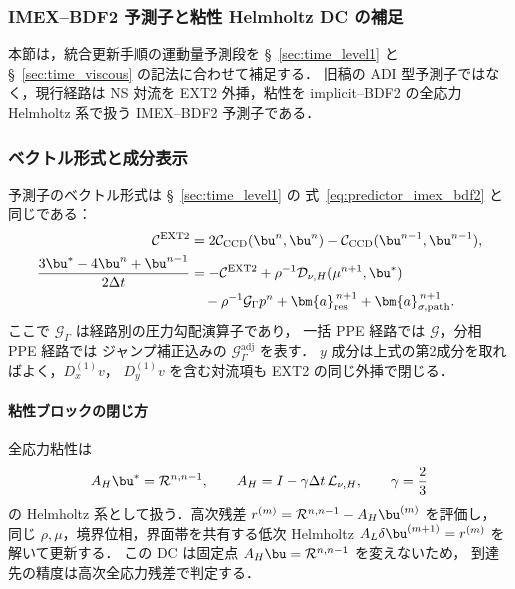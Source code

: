 
\subsubsection{IMEX--BDF2 予測子と粘性 Helmholtz DC の補足}
\label{app:predictor_imex_bdf2_detail}

本節は，統合更新手順の運動量予測段を
§~\ref{sec:time_level1} と §~\ref{sec:time_viscous} の記法に合わせて補足する．
旧稿の ADI 型予測子ではなく，現行経路は
NS 対流を EXT2 外挿，粘性を implicit--BDF2 の全応力 Helmholtz 系で扱う
IMEX--BDF2 予測子である．

\subsubsection{ベクトル形式と成分表示}
\label{app:predictor_components}

予測子のベクトル形式は §~\ref{sec:time_level1} の
式~\eqref{eq:predictor_imex_bdf2} と同じである：
\begin{align*}
  \mathcal{C}^{\mathrm{EXT2}}
    &= 2\mathcal{C}_{\mathrm{CCD}}(\bu^n,\bu^n)
       - \mathcal{C}_{\mathrm{CCD}}(\bu^{n-1},\bu^{n-1}), \\
  \frac{3\bu^* - 4\bu^n + \bu^{n-1}}{2\Delta t}
    &= -\mathcal{C}^{\mathrm{EXT2}}
       + \rho^{-1}\mathcal{D}_{\nu,H}(\mu^{n+1},\bu^*) \\
    &\quad - \rho^{-1}\mathcal{G}_{\Gamma}p^n
       + \bm{a}^{\,n+1}_{\mathrm{res}}
       + \bm{a}^{\,n+1}_{\sigma,\mathrm{path}} .
\end{align*}
ここで $\mathcal{G}_{\Gamma}$ は経路別の圧力勾配演算子であり，
一括 PPE 経路では $\mathcal{G}$，分相 PPE 経路では
ジャンプ補正込みの $\mathcal{G}^{\mathrm{adj}}_{\Gamma}$ を表す．
$y$ 成分は上式の第2成分を取ればよく，$D_x^{(1)}v$，
$D_y^{(1)}v$ を含む対流項も EXT2 の同じ外挿で閉じる．

\paragraph{粘性ブロックの閉じ方}
全応力粘性は
\[
  A_H\bu^* = \mathcal{R}^{n,n-1},
  \qquad
  A_H = I-\gamma\Delta t\,\mathcal{L}_{\nu,H},
  \qquad \gamma=\frac{2}{3}
\]
の Helmholtz 系として扱う．高次残差
$r^{(m)}=\mathcal{R}^{n,n-1}-A_H\bu^{(m)}$ を評価し，
同じ $\rho,\mu$，境界位相，界面帯を共有する低次 Helmholtz
$A_L\delta\bu^{(m+1)}=r^{(m)}$ を解いて更新する．
この DC は固定点 $A_H\bu=\mathcal{R}^{n,n-1}$ を変えないため，
到達先の精度は高次全応力残差で判定する．

